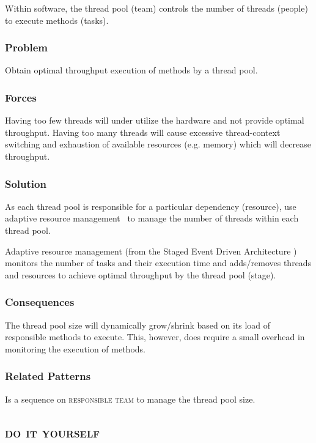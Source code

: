 \documentclass[prodmode]{style/acmlarge}
\begin{document}
Within software, the thread pool (team) controls the number of threads (people)
to execute methods (tasks).

\subsubsection*{\textbf{Problem}} Obtain optimal throughput execution of methods by a
thread pool.

\subsubsection*{Forces} Having too few threads will under utilize the hardware
and not provide optimal throughput.  Having too many threads will cause
excessive thread-context switching and exhaustion of available resources (e.g.
memory) which will decrease throughput.

\subsubsection*{\textbf{Solution}} As each thread pool is responsible for a particular
dependency (resource), use adaptive resource management~\cite{seda} to manage
the number of threads within each thread pool.

Adaptive resource management (from the Staged Event Driven Architecture
\cite{seda}) monitors the number of tasks and their execution time and
adds/removes threads and resources to achieve optimal throughput by the thread
pool (stage).

\subsubsection*{Consequences} The thread pool size will dynamically grow/shrink
based on its load of responsible methods to execute.  This, however, does
require a small overhead in monitoring the execution of methods.

\subsubsection*{Related Patterns} Is a sequence on \textsc{responsible team} to
manage the thread pool size.



\subsection{\textsc{\textbf{do it yourself}}}
\end{document}
